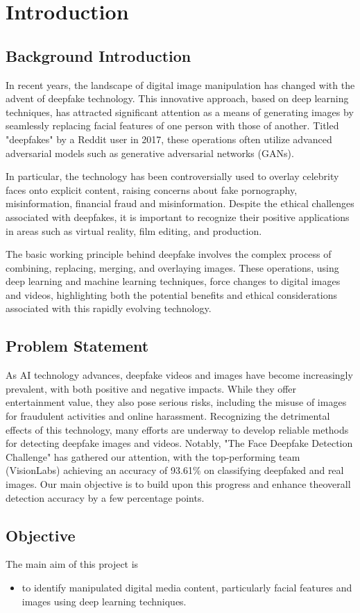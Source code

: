 \chapter{Introduction}
    \section{Background Introduction}
        In recent years, the landscape of digital image manipulation has changed with the advent of deepfake technology.
        This innovative approach, based on deep learning techniques, has attracted significant attention as a means of generating images by seamlessly replacing facial features of one person with those of another.
        Titled "deepfakes" by a Reddit user in 2017, these operations often utilize advanced adversarial models such as generative adversarial networks (GANs).

        In particular, the technology has been controversially used to overlay celebrity faces onto explicit content, raising concerns about fake pornography, misinformation, financial fraud and misinformation.
        Despite the ethical challenges associated with deepfakes, it is important to recognize their positive applications in areas such as virtual reality, film editing, and production.

        The basic working principle behind deepfake involves the complex process of combining, replacing, merging,  and overlaying images.
        These operations, using deep learning and machine learning techniques, force changes to digital images and videos, highlighting both the potential benefits and ethical considerations associated with this rapidly evolving technology.


    \section{Problem Statement}
        As AI technology advances, deepfake videos and images have become increasingly prevalent, with both positive and negative impacts. While they offer entertainment value, they also pose serious risks, including the misuse of images for fraudulent activities and online harassment. Recognizing the detrimental effects of this technology, many efforts are underway to develop reliable methods for detecting deepfake images and videos. Notably, "The Face Deepfake Detection Challenge" \cite{jimaging8100263} has gathered our attention, with the top-performing team (VisionLabs) achieving an accuracy of 93.61\% on classifying deepfaked and real images. Our main objective is to build upon this progress and enhance theoverall detection accuracy by a few percentage points.

    \section{Objective}
        The main aim of this project is 
        \begin{itemize}
            \item to identify manipulated digital media content, particularly facial features and images using deep learning techniques.
        \end{itemize}